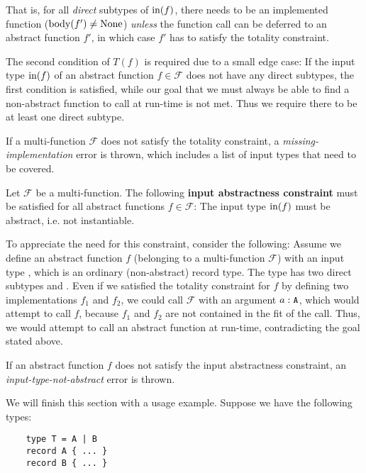 \noindent That is, for all \textit{direct} subtypes of $\operatorname{in}(f)$, there needs to be an implemented function ($\operatorname{body}(f') \neq \text{None}$) \textit{unless} the function call can be deferred to an abstract function $f'$, in which case $f'$ has to satisfy the totality constraint.

The second condition of $T(f)$ is required due to a small edge case: If the input type $\operatorname{in}(f)$ of an abstract function $f \in \mathcal{F}$ does not have any direct subtypes, the first condition is satisfied, while our goal that we must always be able to find a non-abstract function to call at run-time is not met. Thus we require there to be at least one direct subtype.

If a multi-function $\mathcal{F}$ does not satisfy the totality constraint, a \textit{missing-implementation} error is thrown, which includes a list of input types that need to be covered.

\begin{definition} \label{def:input-abstractness-constraint}
	Let $\mathcal{F}$ be a multi-function. The following \textbf{input abstractness constraint} must be satisfied for all abstract functions $f \in \mathcal{F}$: The input type $\operatorname{in}(f)$ must be abstract, i.e. not instantiable.
\end{definition}

\noindent To appreciate the need for this constraint, consider the following: Assume we define an abstract function $f$ (belonging to a multi-function $\mathcal{F}$) with an input type , which is an ordinary (non-abstract) record type. The type  has two direct subtypes  and . Even if we satisfied the totality constraint for $f$ by defining two implementations $f_1$ and $f_2$, we could call $\mathcal{F}$ with an argument $a : \texttt{A}$, which would attempt to call $f$, because $f_1$ and $f_2$ are not contained in the fit of the call. Thus, we would attempt to call an abstract function at run-time, contradicting the goal stated above.

If an abstract function $f$ does not satisfy the input abstractness constraint, an \textit{input-type-not-abstract} error is thrown.

\medskip

\noindent We will finish this section with a usage example. Suppose we have the following types:
\begin{lstlisting}
    type T = A | B
    record A { ... }
    record B { ... }
\end{lstlisting}

